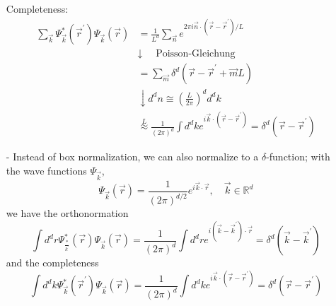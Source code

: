 \begin{enumerate}
\begin{equation}
        \end{equation}
        Completeness:
        \begin{equation}
        \begin{aligned} \sum_{\vec{k}} \Psi_{\vec{k}}^{*}\left(\vec{r}^{\prime}\right) \Psi_{\vec{k}}(\vec{r}) &=\frac{1}{L^{d}} \sum_{\vec{n}} e^{2 \pi i \vec{n} \cdot\left(\vec{r}-\vec{r}^{\prime}\right) / L} \\ & \downarrow \quad \text { Poisson-Gleichung } \\ &=\sum_{\vec{m}} \delta^{d}\left(\vec{r}-\vec{r}^{\prime}+\vec{m} L\right) \\ & \downarrow d^{d} n \cong\left(\frac{L}{2 \pi}\right)^{d} d^{d} k \\ & \stackrel{L}{\approx} \frac{1}{(2 \pi)^{d}} \int d^{d} k e^{i \vec{k} \cdot\left(\vec{r}-\vec{r}^{\prime}\right)}=\delta^{d}\left(\vec{r}-\vec{r}^{\prime}\right) \end{aligned}
        \end{equation}
    \item[-] Instead of box normalization, we can also normalize to a $\delta$-function; with the wave functions $\Psi_{\vec{k}}$,
    \begin{equation}
        \Psi_{\vec{k}}(\vec{r})=\frac{1}{(2 \pi)^{d / 2}} e^{i \vec{k} \cdot \vec{r}}, \quad \vec{k} \in \mathbb{R}^{d}
        \end{equation}
    we have the orthonormation
    \begin{equation}
        \int d^{d} r \Psi_{\frac{*}{k^{\prime}}}^{*}(\vec{r}) \Psi_{\vec{k}}(\vec{r})=\frac{1}{(2 \pi)^{d}} \int d^{d} r e^{i\left(\vec{k}-\vec{k}^{\prime}\right) \cdot \vec{r}}=\delta^{d}\left(\vec{k}-\vec{k}^{\prime}\right)
        \end{equation}
    and the completeness
    \begin{equation}
        \int d^{d} k \Psi_{\vec{k}}^{*}\left(\vec{r}^{\prime}\right) \Psi_{\vec{k}}(\vec{r})=\frac{1}{(2 \pi)^{d}} \int d^{d} k e^{i \vec{k} \cdot\left(\vec{r}-\vec{r}^{\prime}\right)}=\delta^{d}\left(\vec{r}-\vec{r}^{\prime}\right)
        \end{equation}
\end{enumerate}

